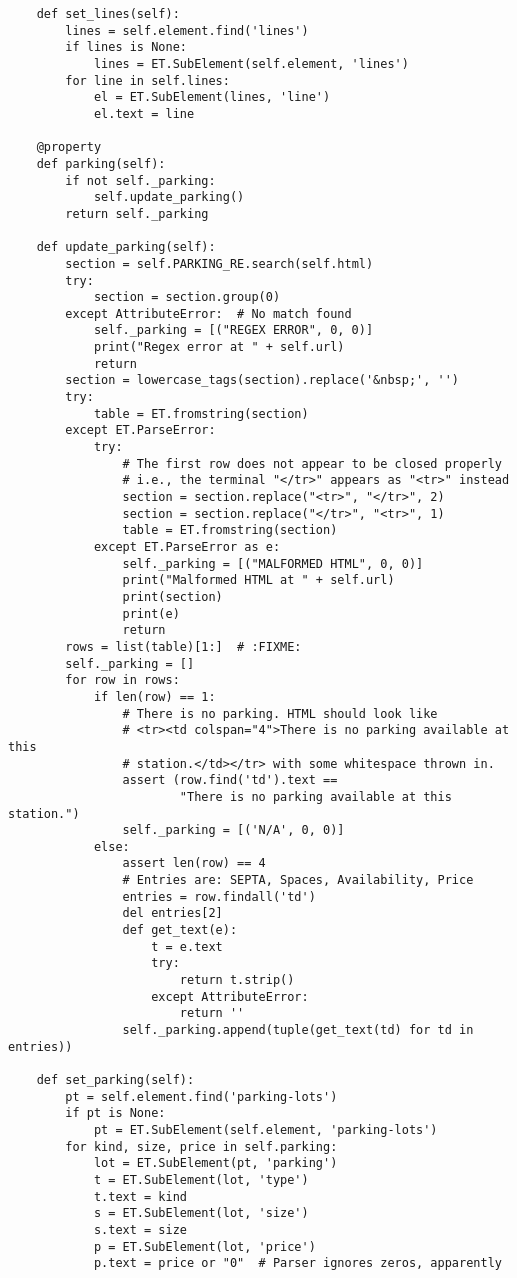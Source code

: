 \documentclass[12pt,titlepage]{article}
\begin{document}
\begin{verbatim}
    def set_lines(self):
        lines = self.element.find('lines')
        if lines is None:
            lines = ET.SubElement(self.element, 'lines')
        for line in self.lines:
            el = ET.SubElement(lines, 'line')
            el.text = line

    @property
    def parking(self):
        if not self._parking:
            self.update_parking()
        return self._parking

    def update_parking(self):
        section = self.PARKING_RE.search(self.html)
        try:
            section = section.group(0)
        except AttributeError:  # No match found
            self._parking = [("REGEX ERROR", 0, 0)]
            print("Regex error at " + self.url)
            return
        section = lowercase_tags(section).replace('&nbsp;', '')
        try:
            table = ET.fromstring(section)
        except ET.ParseError:
            try:
                # The first row does not appear to be closed properly
                # i.e., the terminal "</tr>" appears as "<tr>" instead
                section = section.replace("<tr>", "</tr>", 2)
                section = section.replace("</tr>", "<tr>", 1)
                table = ET.fromstring(section)
            except ET.ParseError as e:
                self._parking = [("MALFORMED HTML", 0, 0)]
                print("Malformed HTML at " + self.url)
                print(section)
                print(e)
                return
        rows = list(table)[1:]  # :FIXME:
        self._parking = []
        for row in rows:
            if len(row) == 1:
                # There is no parking. HTML should look like
                # <tr><td colspan="4">There is no parking available at this
                # station.</td></tr> with some whitespace thrown in.
                assert (row.find('td').text ==
                        "There is no parking available at this station.")
                self._parking = [('N/A', 0, 0)]
            else:
                assert len(row) == 4
                # Entries are: SEPTA, Spaces, Availability, Price
                entries = row.findall('td')
                del entries[2]
                def get_text(e):
                    t = e.text
                    try:
                        return t.strip()
                    except AttributeError:
                        return ''
                self._parking.append(tuple(get_text(td) for td in entries))

    def set_parking(self):
        pt = self.element.find('parking-lots')
        if pt is None:
            pt = ET.SubElement(self.element, 'parking-lots')
        for kind, size, price in self.parking:
            lot = ET.SubElement(pt, 'parking')
            t = ET.SubElement(lot, 'type')
            t.text = kind
            s = ET.SubElement(lot, 'size')
            s.text = size
            p = ET.SubElement(lot, 'price')
            p.text = price or "0"  # Parser ignores zeros, apparently



\end{verbatim}
\end{document}
